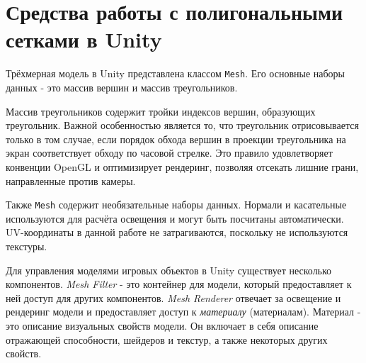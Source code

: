 \section{Средства работы с полигональными сетками в Unity}
Трёхмерная модель в Unity представлена классом \texttt{Mesh}\cite{UnityMesh}. Его основные наборы данных - это массив вершин и массив треугольников.

Массив треугольников содержит тройки индексов вершин, образующих треугольник. Важной особенностью является то, что треугольник отрисовывается только в том случае, если порядок обхода вершин в проекции треугольника на экран соответствует обходу по часовой стрелке. Это правило удовлетворяет конвенции OpenGL и оптимизирует рендеринг, позволяя отсекать лишние грани, направленные против камеры.

Также \texttt{Mesh} содержит необязательные наборы данных. Нормали и касательные используются для расчёта освещения и могут быть посчитаны автоматически. UV-координаты в данной работе не затрагиваются, поскольку не используются текстуры.

Для управления моделями игровых объектов в Unity существует несколько компонентов. \emph{Mesh Filter} - это контейнер для модели, который предоставляет к ней доступ для других компонентов. \emph{Mesh Renderer} отвечает за освещение и рендеринг модели и предоставляет доступ к \emph{материалу} (материалам). Материал - это описание визуальных свойств модели. Он включает в себя описание отражающей способности, шейдеров и текстур, а также некоторых других свойств.
\newpage
